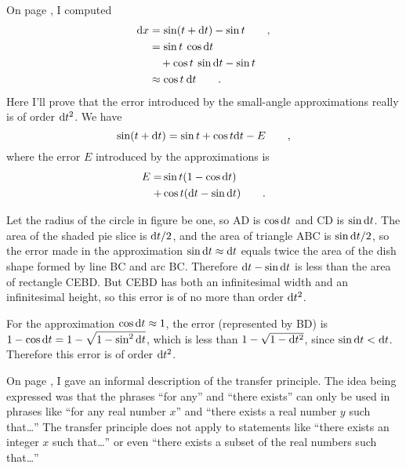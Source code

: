 On page \pageref{eg:derivative-of-sin}, I computed
\begin{align*}
  \textup{d} x &= \sin(t+\textup{d} t)-\sin t \qquad , \\
         &= \sin t \: \cos \textup{d} t \\
         &\quad + \cos t \: \sin \textup{d} t - \sin t \\
         &\approx \cos t \: \textup{d} t \qquad .
\end{align*}
Here I'll prove that the error introduced by the small-angle approximations really
is of order $\textup{d} t^2$. We have
\begin{equation*}
  \sin(t+\textup{d} t) = \sin t + \cos t \textup{d} t - E \qquad ,
\end{equation*}
where the error $E$ introduced by the approximations is
\begin{align*}
  E = &\sin t (1-\cos \textup{d} t) \\
    + &\cos t (\textup{d} t - \sin \textup{d} t) \qquad .
\end{align*}

Let the radius of the circle in figure  be one, so AD
is $\cos \textup{d} t$ and CD is $\sin \textup{d} t$. The area of the shaded pie slice
is $\textup{d} t/2$, and the area of triangle ABC is $\sin\textup{d} t/2$, so the
error made in the approximation $\sin\textup{d} t\approx\textup{d} t$ equals twice
the area of the dish shape formed by line BC and arc BC. Therefore
$\textup{d} t-\sin\textup{d} t$ is less than the area of rectangle CEBD.
But CEBD has both an infinitesimal width and an infinitesimal height,
so this error is of no more than order $\textup{d} t^2$.

For the approximation $\cos\textup{d} t\approx 1$, the error (represented
by BD) is $1-\cos\textup{d} t=1-\sqrt{1-\sin^2\textup{d} t}$, which is less
than $1-\sqrt{1-\textup{d} t^2}$, since $\sin \textup{d} t<\textup{d} t$. Therefore
this error is of order $\textup{d} t^2$.

\label{transfer}
On page \pageref{backref-transfer}, I gave an informal description of the transfer principle.
The idea being expressed was that the phrases ``for any'' and
``there exists'' can only be used in phrases like ``for any real number $x$'' and ``there exists
a real number $y$ such that\ldots'' The transfer principle does not apply to statements like ``there exists
an integer $x$ such that\ldots'' or even ``there exists a subset of the real numbers such that\ldots''

